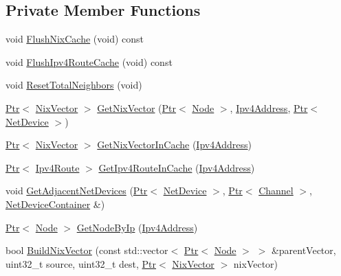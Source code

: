 \subsection*{Private Member Functions}
\begin{DoxyCompactItemize}
\item 
void \hyperlink{classns3_1_1Ipv4NixVectorRouting_a25fb80fd82a26e8b5e33aa953a026723}{Flush\+Nix\+Cache} (void) const 
\item 
void \hyperlink{classns3_1_1Ipv4NixVectorRouting_a327dbe773d1e4a06f732da45d34e15d7}{Flush\+Ipv4\+Route\+Cache} (void) const 
\item 
void \hyperlink{classns3_1_1Ipv4NixVectorRouting_ac702e006e998efe33f5db76c79618bfc}{Reset\+Total\+Neighbors} (void)
\item 
\hyperlink{classns3_1_1Ptr}{Ptr}$<$ \hyperlink{classns3_1_1NixVector}{Nix\+Vector} $>$ \hyperlink{classns3_1_1Ipv4NixVectorRouting_ad1f618c1b1264f0d01644b9a68a0bd20}{Get\+Nix\+Vector} (\hyperlink{classns3_1_1Ptr}{Ptr}$<$ \hyperlink{classns3_1_1Node}{Node} $>$, \hyperlink{classns3_1_1Ipv4Address}{Ipv4\+Address}, \hyperlink{classns3_1_1Ptr}{Ptr}$<$ \hyperlink{classns3_1_1NetDevice}{Net\+Device} $>$)
\item 
\hyperlink{classns3_1_1Ptr}{Ptr}$<$ \hyperlink{classns3_1_1NixVector}{Nix\+Vector} $>$ \hyperlink{classns3_1_1Ipv4NixVectorRouting_afeecd07d75e1fda9a99d1f914ec331ce}{Get\+Nix\+Vector\+In\+Cache} (\hyperlink{classns3_1_1Ipv4Address}{Ipv4\+Address})
\item 
\hyperlink{classns3_1_1Ptr}{Ptr}$<$ \hyperlink{classns3_1_1Ipv4Route}{Ipv4\+Route} $>$ \hyperlink{classns3_1_1Ipv4NixVectorRouting_a1d352caa92d6d91e6cb94ecc31be4411}{Get\+Ipv4\+Route\+In\+Cache} (\hyperlink{classns3_1_1Ipv4Address}{Ipv4\+Address})
\item 
void \hyperlink{classns3_1_1Ipv4NixVectorRouting_a1037f3752d6583eca8cd83c72e0673ea}{Get\+Adjacent\+Net\+Devices} (\hyperlink{classns3_1_1Ptr}{Ptr}$<$ \hyperlink{classns3_1_1NetDevice}{Net\+Device} $>$, \hyperlink{classns3_1_1Ptr}{Ptr}$<$ \hyperlink{classns3_1_1Channel}{Channel} $>$, \hyperlink{classns3_1_1NetDeviceContainer}{Net\+Device\+Container} \&)
\item 
\hyperlink{classns3_1_1Ptr}{Ptr}$<$ \hyperlink{classns3_1_1Node}{Node} $>$ \hyperlink{classns3_1_1Ipv4NixVectorRouting_a24d3474ebcb1fc7da5a133dc071cd2df}{Get\+Node\+By\+Ip} (\hyperlink{classns3_1_1Ipv4Address}{Ipv4\+Address})
\item 
bool \hyperlink{classns3_1_1Ipv4NixVectorRouting_ac797bda1b70ad4c4aa7e8d5729a50455}{Build\+Nix\+Vector} (const std\+::vector$<$ \hyperlink{classns3_1_1Ptr}{Ptr}$<$ \hyperlink{classns3_1_1Node}{Node} $>$ $>$ \&parent\+Vector, uint32\+\_\+t source, uint32\+\_\+t dest, \hyperlink{classns3_1_1Ptr}{Ptr}$<$ \hyperlink{classns3_1_1NixVector}{Nix\+Vector} $>$ nix\+Vector)

\end{DoxyCompactItemize}

